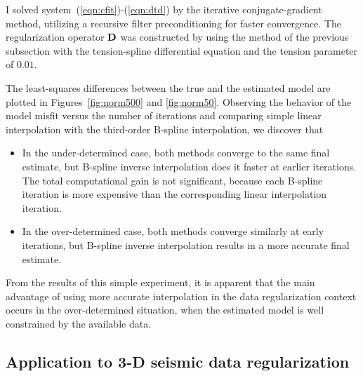 
\par
I solved system~(\ref{eqn:cfit})-(\ref{eqn:dtd}) by the iterative
conjugate-gradient method, utilizing a recursive filter
preconditioning \cite{Fomel.sep.94.sergey1} for faster convergence.
The regularization operator $\bold{D}$ was constructed by using the
method of the previous subsection with the tension-spline differential
equation \cite{GEO55.03.02930305,Fomel.sep.103.sergey1} and the
tension parameter of $0.01$.
\par
The least-squares differences between the true and the estimated model
are plotted in Figures~\ref{fig:norm500} and \ref{fig:norm50}.
Observing the behavior of the model misfit versus the number of
iterations and comparing simple linear interpolation with the
third-order B-spline interpolation, we discover that
\begin{itemize}
\item In the under-determined case, both methods converge to the same
  final estimate, but B-spline inverse interpolation does it faster at
  earlier iterations. The total computational gain is not significant,
  because each B-spline iteration is more expensive than the
  corresponding linear interpolation iteration.
\item In the over-determined case, both methods converge similarly at
  early iterations, but B-spline inverse interpolation results in a
  more accurate final estimate.
\end{itemize}
From the results of this simple experiment, it is apparent that the
main advantage of using more accurate interpolation in the data
regularization context occurs in the over-determined situation, when
the estimated model is well constrained by the available data.


\subsection{Application to 3-D seismic data regularization}


